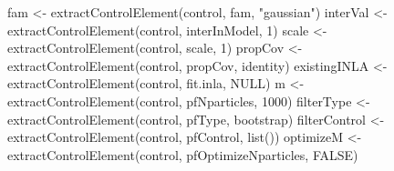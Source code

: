 \documentclass[
]{article}
\newenvironment{Shaded}{\begin{snugshade}}{\end{snugshade}}
\newcommand{\ConstantTok}[1]{\textcolor[rgb]{0.56,0.35,0.01}{#1}}
\newcommand{\DecValTok}[1]{\textcolor[rgb]{0.68,0.00,0.00}{#1}}
\newcommand{\FunctionTok}[1]{\textcolor[rgb]{0.28,0.35,0.67}{#1}}
\newcommand{\NormalTok}[1]{\textcolor[rgb]{0.00,0.23,0.31}{#1}}
\newcommand{\OtherTok}[1]{\textcolor[rgb]{0.00,0.23,0.31}{#1}}
\newcommand{\StringTok}[1]{\textcolor[rgb]{0.13,0.47,0.30}{#1}}
\begin{document}
\begin{Shaded}
\begin{Highlighting}[]
\NormalTok{    fam                 }\OtherTok{\textless{}{-}} \FunctionTok{extractControlElement}\NormalTok{(control, }\StringTok{\textquotesingle{}fam\textquotesingle{}}\NormalTok{,  }\StringTok{"gaussian"}\NormalTok{)}
\NormalTok{    interVal            }\OtherTok{\textless{}{-}} \FunctionTok{extractControlElement}\NormalTok{(control, }\StringTok{\textquotesingle{}interInModel\textquotesingle{}}\NormalTok{,  }\DecValTok{1}\NormalTok{)}
\NormalTok{    scale               }\OtherTok{\textless{}{-}} \FunctionTok{extractControlElement}\NormalTok{(control, }\StringTok{\textquotesingle{}scale\textquotesingle{}}\NormalTok{,                }\DecValTok{1}\NormalTok{)}
\NormalTok{    propCov             }\OtherTok{\textless{}{-}} \FunctionTok{extractControlElement}\NormalTok{(control, }\StringTok{\textquotesingle{}propCov\textquotesingle{}}\NormalTok{,              }\StringTok{\textquotesingle{}identity\textquotesingle{}}\NormalTok{)}
\NormalTok{    existingINLA        }\OtherTok{\textless{}{-}} \FunctionTok{extractControlElement}\NormalTok{(control, }\StringTok{\textquotesingle{}fit.inla\textquotesingle{}}\NormalTok{,                   }\ConstantTok{NULL}\NormalTok{)}
\NormalTok{    m                   }\OtherTok{\textless{}{-}} \FunctionTok{extractControlElement}\NormalTok{(control, }\StringTok{\textquotesingle{}pfNparticles\textquotesingle{}}\NormalTok{,         }\DecValTok{1000}\NormalTok{)}
\NormalTok{    filterType          }\OtherTok{\textless{}{-}} \FunctionTok{extractControlElement}\NormalTok{(control, }\StringTok{\textquotesingle{}pfType\textquotesingle{}}\NormalTok{,               }\StringTok{\textquotesingle{}bootstrap\textquotesingle{}}\NormalTok{)}
\NormalTok{    filterControl       }\OtherTok{\textless{}{-}} \FunctionTok{extractControlElement}\NormalTok{(control, }\StringTok{\textquotesingle{}pfControl\textquotesingle{}}\NormalTok{,            }\FunctionTok{list}\NormalTok{())}
\NormalTok{    optimizeM           }\OtherTok{\textless{}{-}} \FunctionTok{extractControlElement}\NormalTok{(control, }\StringTok{\textquotesingle{}pfOptimizeNparticles\textquotesingle{}}\NormalTok{, }\ConstantTok{FALSE}\NormalTok{)}
 

\end{Highlighting}
\end{Shaded}
\end{document}
